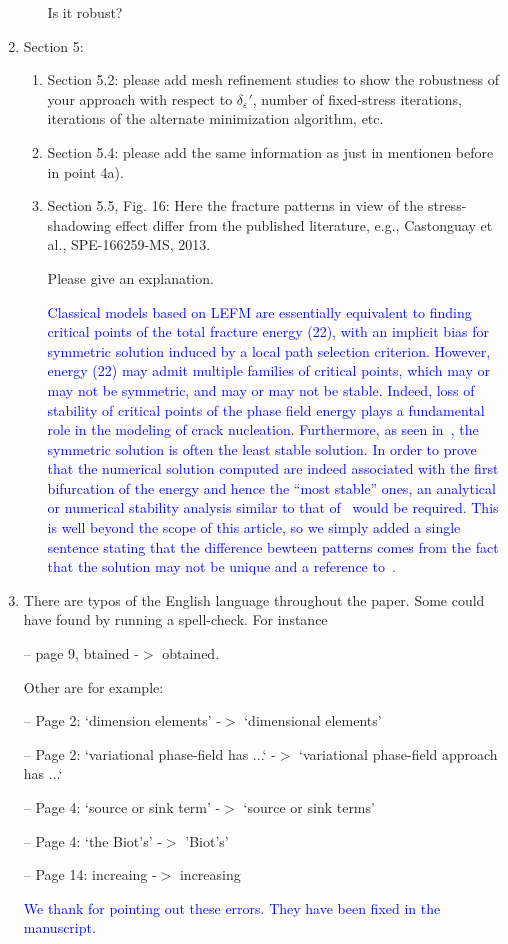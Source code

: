 \documentclass{article}
\newcommand{\AuthCom}[1]{\textcolor{blue}{#1}}
\begin{document}
\begin{enumerate}
\begin{enumerate}
Is it robust?
\end{enumerate}

\item Section 5: 
\begin{enumerate}
	\item Section 5.2: please add mesh refinement studies to show the robustness of your approach with respect to $\delta_{\varepsilon}'$, number of fixed-stress iterations, iterations of the alternate minimization algorithm, etc.

	\item Section 5.4: please add the same information as just in mentionen before in point 4a).

	\item Section 5.5, Fig. 16: Here the fracture patterns in view of the stress-shadowing effect differ from the published literature, e.g., Castonguay et al., SPE-166259-MS, 2013.
	
Please give an explanation.

	\AuthCom{
	Classical models based on LEFM are essentially equivalent to finding critical points of the total fracture energy (22), with an implicit bias for symmetric solution induced by a local path selection criterion. However, energy (22) may admit multiple families of critical points, which may or may not be symmetric, and may or may not be stable. Indeed, loss of stability of critical points of the phase field energy plays a fundamental role in the modeling of crack nucleation. Furthermore, as seen in~\cite{Tanne-2017a}, the symmetric solution is often the least stable solution. In order to prove that the numerical solution computed are indeed associated with the first bifurcation of the energy and hence the ``most stable'' ones, an analytical or numerical stability analysis similar to that of~\cite{GeromelFisher-Marigo-2018a} would be required. This is well beyond the scope of this article, so we simply added a single sentence stating that the difference bewteen patterns comes from the fact that the solution may not be unique and a reference to~\cite{Tanne-2017a,Tanne-Chukwudozie-EtAl-2019a}.
}
\end{enumerate}

\item There are typos of the English language throughout the paper.
Some could have found by running a spell-check. For instance

-- page 9, btained -$>$ obtained.

Other are for example:

-- Page 2: `dimension elements' -$>$ `dimensional elements'

-- Page 2: `variational phase-field has ...` -$>$ `variational phase-field approach has ...`

-- Page 4: `source or sink term' -$>$ `source or sink terms'

-- Page 4: `the Biot's' -$>$ 'Biot's'

-- Page 14: increaing -$>$ increasing

    \AuthCom{We thank for pointing out these errors. They have been fixed in the manuscript.}

\end{enumerate}
\end{document}
